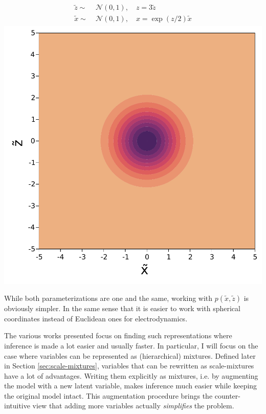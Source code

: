 \begin{minipage}{0.5\textwidth}
    \centering
    \begin{align}
        \begin{aligned}
            \tilde{z} \sim&\; \mathcal{N}(0, 1),\quad z = 3\tilde{z}\\
            \tilde{x} \sim&\; \mathcal{N}(0, 1),\quad x = \exp(z/2)\tilde{x}
        \end{aligned}
    \end{align}
    \includegraphics[width=\textwidth]{./chapters/1_introduction/figures/neals_funnel_non_centered.pdf}
    \label{fig:neals_centered}
\end{minipage}
\vspace{0.5cm}

While both parameterizations are one and the same, working with $p(\tilde{x},\tilde{z})$ is obviously simpler.
In the same sense that it is easier to work with spherical coordinates instead of Euclidean ones for electrodynamics. 

The various works presented focus on finding such representations where inference is made a lot easier and usually faster.
In particular, I will focus on the case where variables can be represented as (hierarchical) mixtures.
Defined later in Section \ref{sec:scale-mixtures}, variables that can be rewritten as scale-mixtures have a lot of advantages.
Writing them explicitly as mixtures, i.e. by augmenting the model with a new latent variable, makes inference much easier while keeping the original model intact.
This augmentation procedure brings the counter-intuitive view that adding more variables actually \textit{simplifies} the problem.

